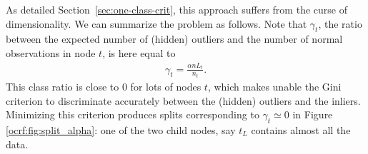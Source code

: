 As detailed Section~\ref{sec:one-class-crit}, this approach suffers from the curse of dimensionality. 
We can summarize the problem as follows.
Note that $\gamma_t$, the ratio between the expected number of (hidden) outliers and the number of normal observations in node $t$, is here equal to %
\begin{align}
\label{ocrf:def:gamma_t}
\gamma_t = \frac{\alpha n L_t}{n_t}.
\end{align}
This class ratio is close to $0$ for lots of nodes $t$, which makes unable the Gini criterion to discriminate accurately between the (hidden) outliers and the inliers.
%
%
%
Minimizing this criterion produces splits corresponding to $\gamma_t\simeq 0$ in Figure \ref{ocrf:fig:split_alpha}: one of the two child nodes, say $t_L$ contains almost all the data. 
%


